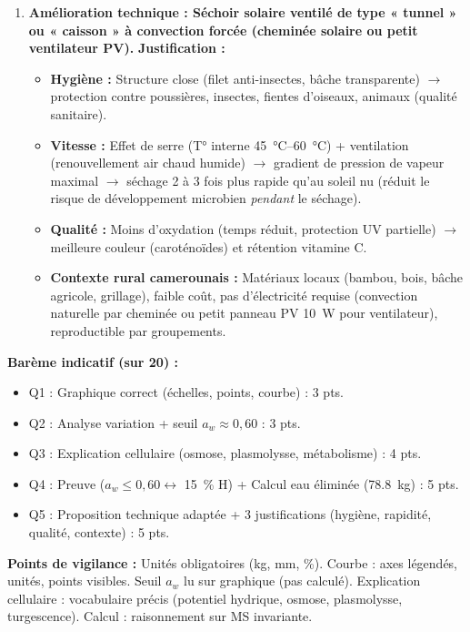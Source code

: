 \documentclass[11pt]{article}
\begin{document}
\begin{corrige}
\begin{enumerate}
\item \textbf{Amélioration technique : Séchoir solaire ventilé de type « tunnel » ou « caisson » à convection forcée (cheminée solaire ou petit ventilateur PV).}
\textbf{Justification :}
\begin{itemize}
\item \textbf{Hygiène :} Structure close (filet anti-insectes, bâche transparente) $\to$ protection contre poussières, insectes, fientes d'oiseaux, animaux (qualité sanitaire).
\item \textbf{Vitesse :} Effet de serre (T° interne \SI{45}{\degreeCelsius}--\SI{60}{\degreeCelsius}) + ventilation (renouvellement air chaud humide) $\to$ gradient de pression de vapeur maximal $\to$ séchage 2 à 3 fois plus rapide qu'au soleil nu (réduit le risque de développement microbien \emph{pendant} le séchage).
\item \textbf{Qualité :} Moins d'oxydation (temps réduit, protection UV partielle) $\to$ meilleure couleur (caroténoïdes) et rétention vitamine C.
\item \textbf{Contexte rural camerounais :} Matériaux locaux (bambou, bois, bâche agricole, grillage), faible coût, pas d'électricité requise (convection naturelle par cheminée ou petit panneau PV \SI{10}{\watt} pour ventilateur), reproductible par groupements.
\end{itemize}
\end{enumerate}

\vspace{0,5cm}
\noindent\textbf{Barème indicatif (sur 20) :}
\begin{itemize}
\item Q1 : Graphique correct (échelles, points, courbe) : 3 pts.
\item Q2 : Analyse variation + seuil $a_w \approx 0,60$ : 3 pts.
\item Q3 : Explication cellulaire (osmose, plasmolysse, métabolisme) : 4 pts.
\item Q4 : Preuve ($a_w \le 0,60 \leftrightarrow$ \SI{15}{\%} H) + Calcul eau éliminée (\SI{78,8}{\kg}) : 5 pts.
\item Q5 : Proposition technique adaptée + 3 justifications (hygiène, rapidité, qualité, contexte) : 5 pts.
\end{itemize}
\textbf{Points de vigilance :} Unités obligatoires (kg, mm, \%). Courbe : axes légendés, unités, points visibles. Seuil $a_w$ lu sur graphique (pas calculé). Explication cellulaire : vocabulaire précis (potentiel hydrique, osmose, plasmolysse, turgescence). Calcul : raisonnement sur MS invariante.
\end{corrige}
\end{document}
